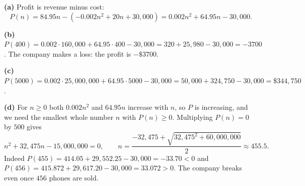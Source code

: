 \textbf{(a)} Profit is revenue minus cost:
\[P(n)=84.95n-\left(-0.002n^2+20n+30{,}000\right)=\boxed{0.002n^2+64.95n-30{,}000}.\]

\textbf{(b)} $P(400)=0.002\cdot160{,}000+64.95\cdot400-30{,}000=320+25{,}980-30{,}000=-3700$. The company makes a loss: the profit is $\boxed{-\$3700}$.

\textbf{(c)} $P(5000)=0.002\cdot25{,}000{,}000+64.95\cdot5000-30{,}000=50{,}000+324{,}750-30{,}000=\boxed{\$344{,}750}$.

\textbf{(d)} For $n\ge0$ both $0.002n^2$ and $64.95n$ increase with $n$, so $P$ is increasing, and we need the smallest whole number $n$ with $P(n)\ge0$. Multiplying $P(n)=0$ by $500$ gives
\[n^2+32{,}475n-15{,}000{,}000=0,\qquad n=\dfrac{-32{,}475+\sqrt{32{,}475^2+60{,}000{,}000}}{2}\approx455.5.\]
Indeed $P(455)=414.05+29{,}552.25-30{,}000=-33.70<0$ and $P(456)=415.872+29{,}617.20-30{,}000=33.072>0$. The company breaks even once $\boxed{456}$ phones are sold.
